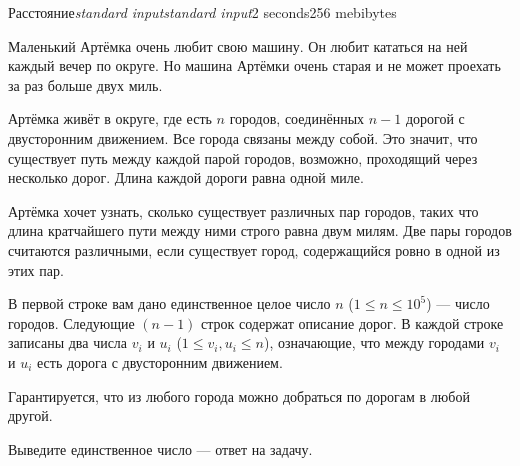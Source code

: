 \begin{problem}{Расстояние}{\textsl{standard input}}{\textsl{standard input}}{2 seconds}{256 mebibytes}{}

Маленький Артёмка очень любит свою машину. Он любит кататься на ней каждый вечер по округе. Но машина Артёмки очень старая и не может проехать за раз больше двух миль.

Артёмка живёт в округе, где есть $n$ городов, соединённых $n - 1$ дорогой с двусторонним движением. Все города связаны между собой. Это значит, что существует путь между каждой парой городов, возможно, проходящий через несколько дорог. Длина каждой дороги равна одной миле.

Артёмка хочет узнать, сколько существует различных пар городов, таких что длина кратчайшего пути между ними строго равна двум милям. Две пары городов считаются различными, если существует город, содержащийся ровно в одной из этих пар.

\InputFile
В первой строке вам дано единственное целое число $n$ ($1 \le n \le 10^5$) --- число городов. Следующие $(n - 1)$ строк содержат описание дорог. В каждой строке записаны два числа $v_i$ и $u_i$ ($1 \le v_i, u_i \le n$), означающие, что между городами $v_i$ и $u_i$ есть дорога с двусторонним движением.

Гарантируется, что из любого города можно добраться по дорогам в любой другой.

\OutputFile
Выведите единственное число --- ответ на задачу.


\Examples

\begin{example}
%
%
\end{example}

\end{problem}
